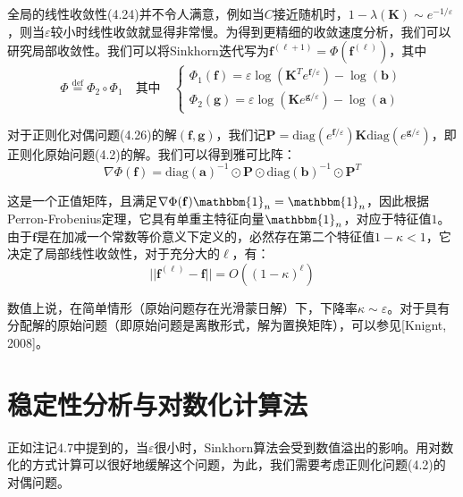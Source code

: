 \documentclass[cn,10pt,math=newtx,citestyle=gb7714-2015,bibstyle=gb7714-2015]{elegantbook}
\begin{document}
\begin{postulate}[局部收敛性]
全局的线性收敛性(4.24)并不令人满意，例如当$C$接近随机时，$1-\lambda(\mathbf{K})\sim e^{-1/\varepsilon}$，则当$\varepsilon$较小时线性收敛就显得非常慢。为得到更精细的收敛速度分析，我们可以研究局部收敛性。我们可以将Sinkhorn迭代写为$\mathbf{f}^{(\ell+1)}=\Phi(\mathbf{f}^{(\ell)})$，其中
\begin{equation*}
    \Phi\overset{\text{def}}{=}\Phi_2\circ\Phi_1 \quad \text{其中} \quad \left\{ \begin{array}{l}
         \Phi_1(\mathbf{f}) = \varepsilon \log( \mathbf{K}^Te^{\mathbf{f}/\varepsilon})-\log(\mathbf{b}) \\
          \Phi_2(\mathbf{g}) = \varepsilon \log( \mathbf{K}e^{\mathbf{g}/\varepsilon})-\log(\mathbf{a})
    \end{array}\right.
\end{equation*}

对于正则化对偶问题(4.26)的解$(\mathbf{f,g})$，我们记$\mathbf{P}=\text{diag}(e^{\mathbf{f}/\varepsilon})\mathbf{K}\text{diag}(e^{\mathbf{g}/\varepsilon})$，即正则化原始问题(4.2)的解。我们可以得到雅可比阵：
\begin{equation}
    \label{4.25}
    \nabla \Phi(\mathbf{f}) = \text{diag}(\mathbf{a})^{-1} \odot \mathbf{P} \odot \text{diag}(\mathbf{b})^{-1} \odot \mathbf{P}^T
\end{equation}

这是一个正值矩阵，且满足$\nabla \Phi(\mathbf{f})\mathbbm{1}_n=\mathbbm{1}_n$，因此根据Perron-Frobenius定理，它具有单重主特征向量$\mathbbm{1}_n$，对应于特征值$1$。由于$\mathbf{f}$是在加减一个常数等价意义下定义的，必然存在第二个特征值$1-\kappa < 1$，它决定了局部线性收敛性，对于充分大的$\ell$，有：
\begin{equation*}
    ||\mathbf{f}^{(\ell)}-\mathbf{f}||=O((1-\kappa)^\ell)
\end{equation*}

数值上说，在简单情形（原始问题存在光滑蒙日解）下，下降率$\kappa \sim \varepsilon$。对于具有分配解的原始问题（即原始问题是离散形式，解为置换矩阵），可以参见[Knignt, 2008]。
\end{postulate}

\section{稳定性分析与对数化计算法}

正如注记4.7中提到的，当$\varepsilon$很小时，Sinkhorn算法会受到数值溢出的影响。用对数化的方式计算可以很好地缓解这个问题，为此，我们需要考虑正则化问题(4.2)的对偶问题。
\end{document}
